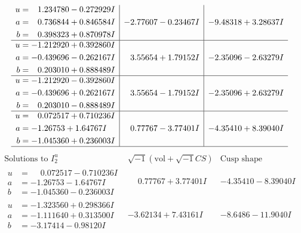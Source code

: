 \documentclass[1p]{elsarticle_modified}
\theoremstyle{definition}
\newcommand{\I}{\sqrt{-1}}
\begin{document}
$$\begin{array}{c|c|c}
\begin{aligned}
u &= \phantom{-}1.234780 - 0.272929 I \\
a &= \phantom{-}0.736844 + 0.846584 I \\
b &= \phantom{-}0.398323 + 0.870978 I\end{aligned}
 & -2.77607 - 0.23467 I & -9.48318 + 3.28637 I \\ \hline\begin{aligned}
u &= -1.212920 + 0.392860 I \\
a &= -0.439696 - 0.262167 I \\
b &= \phantom{-}0.203010 + 0.888489 I\end{aligned}
 & \phantom{-}3.55654 + 1.79152 I & -2.35096 - 2.63279 I \\ \hline\begin{aligned}
u &= -1.212920 - 0.392860 I \\
a &= -0.439696 + 0.262167 I \\
b &= \phantom{-}0.203010 - 0.888489 I\end{aligned}
 & \phantom{-}3.55654 - 1.79152 I & -2.35096 + 2.63279 I \\ \hline\begin{aligned}
u &= \phantom{-}0.072517 + 0.710236 I \\
a &= -1.26753 + 1.64767 I \\
b &= -1.045360 + 0.236003 I\end{aligned}
 & \phantom{-}0.77767 - 3.77401 I & -4.35410 + 8.39040 I\\
 \hline 
 \end{array}$$\newpage$$\begin{array}{c|c|c}  
\text{Solutions to }I^u_{2}& \I (\text{vol} + \sqrt{-1}CS) & \text{Cusp shape}\\
 \hline 
\begin{aligned}
u &= \phantom{-}0.072517 - 0.710236 I \\
a &= -1.26753 - 1.64767 I \\
b &= -1.045360 - 0.236003 I\end{aligned}
 & \phantom{-}0.77767 + 3.77401 I & -4.35410 - 8.39040 I \\ \hline\begin{aligned}
u &= -1.323560 + 0.298366 I \\
a &= -1.111640 + 0.313500 I \\
b &= -3.17414 - 0.98120 I\end{aligned}
 & -3.62134 + 7.43161 I & -8.6486 - 11.9040 I \\ \hline\begin{aligned}

\end{aligned}
\end{array}$$
\end{document}
